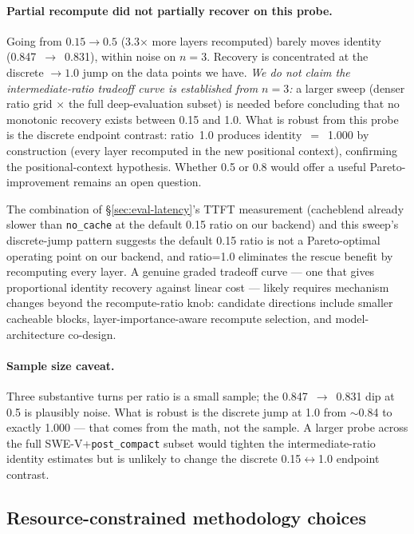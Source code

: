 \paragraph{Partial recompute did not partially recover on this
probe.} Going from $0.15 \to 0.5$ (3.3$\times$ more layers recomputed)
barely moves identity (0.847~$\to$~0.831), within noise on $n{=}3$.
Recovery is concentrated at the discrete $\to{}1.0$ jump on the data
points we have. \emph{We do not claim the intermediate-ratio tradeoff
curve is established from $n{=}3$:} a larger sweep (denser ratio grid
$\times$ the full deep-evaluation subset) is needed before
concluding that no monotonic recovery exists between 0.15 and 1.0.
What is robust from this probe is the discrete endpoint contrast:
ratio~1.0 produces identity~$=$~1.000 by construction (every layer
recomputed in the new positional context), confirming the
positional-context hypothesis. Whether 0.5 or 0.8 would offer a
useful Pareto-improvement remains an open question.

The combination of \S\ref{sec:eval-latency}'s TTFT measurement
(cacheblend already slower than \texttt{no\_cache} at the default
0.15 ratio on our backend) and this sweep's discrete-jump pattern
suggests the default 0.15 ratio is not a Pareto-optimal operating
point on our backend, and ratio=1.0 eliminates the rescue benefit
by recomputing every layer. A genuine graded tradeoff curve --- one
that gives proportional identity recovery against linear cost ---
likely requires mechanism changes beyond the recompute-ratio knob:
candidate directions include smaller cacheable blocks,
layer-importance-aware recompute selection, and model-architecture
co-design.

\paragraph{Sample size caveat.} Three substantive turns per ratio is
a small sample; the 0.847~$\to$~0.831 dip at 0.5 is plausibly noise.
What is robust is the discrete jump at 1.0 from $\sim$0.84 to exactly
1.000 --- that comes from the math, not the sample. A larger probe
across the full SWE-V+\texttt{post\_compact} subset would tighten the intermediate-ratio
identity estimates but is unlikely to change the discrete
0.15$\leftrightarrow$1.0 endpoint contrast.

\subsection{Resource-constrained methodology choices}
\label{sec:disc-resource}

